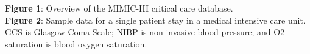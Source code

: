 \documentclass[english]{article}
\begin{document}


\noindent
\textbf{Figure 1}: Overview of the MIMIC-III critical care database. \\

\noindent
\textbf{Figure 2}: Sample data for a single patient stay in a medical intensive care unit. GCS is Glasgow Coma Scale; NIBP is non-invasive blood pressure; and O2 saturation is blood oxygen saturation.



\end{document}
